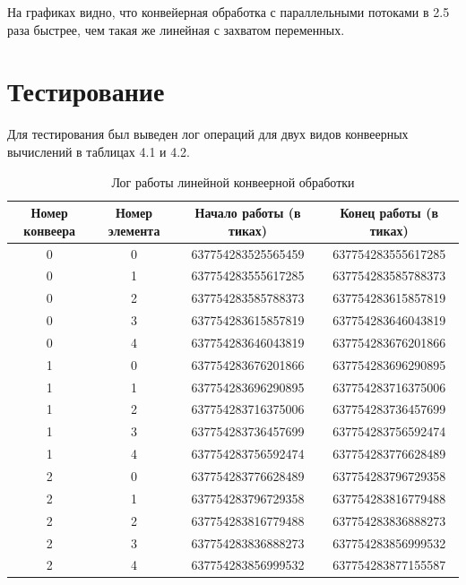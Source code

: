 \documentclass[12pt]{report}
\begin{document}
На графиках видно, что конвейерная обработка с параллельными потоками в 2.5 раза быстрее, чем такая же линейная с захватом переменных.

\section{Тестирование}
Для тестирования был выведен лог операций для двух видов конвеерных вычислений в таблицах 4.1 и 4.2.

\begin{table}[H]
	\caption{Лог работы линейной конвеерной обработки}
	\begin{center}
		
		\begin{tabular}{|c|c|c|c|}
			\hline
			Номер конвеера & Номер элемента  & Начало работы (в тиках) & Конец работы (в тиках)\\
			\hline
			
			0 & 0 & 637754283525565459 & 637754283555617285\\
			0 & 1 & 637754283555617285 & 637754283585788373\\
			0 & 2 & 637754283585788373 & 637754283615857819\\
			0 & 3 & 637754283615857819 & 637754283646043819\\
			0 & 4 & 637754283646043819 & 637754283676201866\\
			\hline
			
			1 & 0 & 637754283676201866 & 637754283696290895\\
			1 & 1 & 637754283696290895 & 637754283716375006\\
			1 & 2 & 637754283716375006 & 637754283736457699\\
			1 & 3 & 637754283736457699 & 637754283756592474\\
			1 & 4 & 637754283756592474 & 637754283776628489\\
			\hline
			
			2 & 0 & 637754283776628489 & 637754283796729358\\
			2 & 1 & 637754283796729358 & 637754283816779488\\
			2 & 2 & 637754283816779488 & 637754283836888273\\
			2 & 3 & 637754283836888273 & 637754283856999532\\
			2 & 4 & 637754283856999532 & 637754283877155587\\
			
			\hline
		\end{tabular}
	\end{center}
\end{table} 
\end{document}
